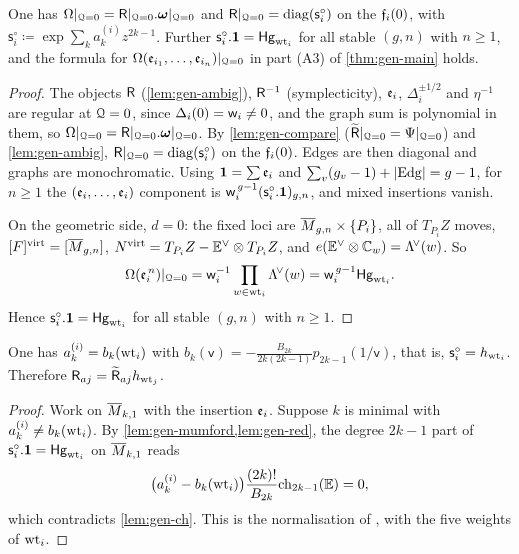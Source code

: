 \begin{lem}[Reduction at $\cQ=0$]
\label{lem:gen-red}
One has $\Omega|_{\mathcal{Q}=0}=\mathsf{R}|_{\mathcal{Q}=0}.\boldsymbol{\omega}|_{\mathcal{Q}=0}$ and $\mathsf{R}|_{\mathcal{Q}=0}=\mathrm{diag}(\mathsf{s}^{\circ}_i)$ on the $\mathfrak{f}_i(0)$, with $\mathsf{s}^{\circ}_i\coloneqq\exp\sum_ka_k^{(i)}z^{2k-1}$. Further $\mathsf{s}^{\circ}_i.\mathbf{1}=\mathsf{Hg}_{\mathrm{wt}_i}$ for all stable $(g,n)$ with $n\geq1$, and the formula for $\Omega(\mathfrak{e}_{i_1},\dots,\mathfrak{e}_{i_n})|_{\mathcal{Q}=0}$ in part (A3) of \cref{thm:gen-main} holds.
\end{lem}
\begin{proof}
The objects $\mathsf{R}$ (\cref{lem:gen-ambig}), $\mathsf{R}^{-1}$ (symplecticity), $\mathfrak{e}_i$, $\Delta_i^{\pm1/2}$ and $\eta^{-1}$ are regular at $\cQ=0$, since $\Delta_i(0)=\mathsf{w}_i\neq0$, and the graph sum is polynomial in them, so $\Omega|_{\mathcal{Q}=0}=\mathsf{R}|_{\mathcal{Q}=0}.\boldsymbol{\omega}|_{\mathcal{Q}=0}$. By \cref{lem:gen-compare} ($\widetilde{\mathsf{R}}|_{\mathcal{Q}=0}=\Psi|_{\mathcal{Q}=0}$) and \cref{lem:gen-ambig}, $\mathsf{R}|_{\mathcal{Q}=0}=\mathrm{diag}(\mathsf{s}^{\circ}_i)$ on the $\mathfrak{f}_i(0)$. Edges are then diagonal and graphs are monochromatic. Using $\mathbf{1}=\sum\mathfrak{e}_i$ and $\sum_v(g_v-1)+|\mathrm{Edg}|=g-1$, for $n\geq1$ the $(\mathfrak{e}_i,\dots,\mathfrak{e}_i)$ component is $\mathsf{w}_i^{\,g-1}(\mathsf{s}^{\circ}_i.\mathbf{1})_{g,n}$, and mixed insertions vanish.

On the geometric side, $d=0$: the fixed loci are $\overline{M}_{g,n}\times\{P_i\}$, all of $T_{P_i}Z$ moves, $[F]^{\mathrm{virt}}=[\overline{M}_{g,n}]$, $N^{\mathrm{virt}}=T_{P_i}Z-\mathbb{E}^\vee\otimes T_{P_i}Z$, and $e(\mathbb{E}^\vee\otimes\mathbb{C}_w)=\Lambda^{\!\vee}(w)$. So
\[
\Omega(\mathfrak{e}_i^{\,n})|_{\mathcal{Q}=0}=\mathsf{w}_i^{-1}\prod_{w\in\mathrm{wt}_i}\Lambda^{\!\vee}(w)=\mathsf{w}_i^{\,g-1}\mathsf{Hg}_{\mathrm{wt}_i}.
\]
Hence $\mathsf{s}^{\circ}_i.\mathbf{1}=\mathsf{Hg}_{\mathrm{wt}_i}$ for all stable $(g,n)$ with $n\geq1$.
\end{proof}

\begin{thm}
\label{thm:gen-const}
One has $a_k^{(i)}=b_k(\mathrm{wt}_i)$ with $b_k(\mathsf{v})=-\frac{B_{2k}}{2k(2k-1)}p_{2k-1}(1/\mathsf{v})$, that is, $\mathsf{s}^{\circ}_i=h_{\mathrm{wt}_i}$. Therefore $\mathsf{R}_{aj}=\widetilde{\mathsf{R}}_{aj}h_{\mathrm{wt}_j}$.
\end{thm}
\begin{proof}
Work on $\overline{M}_{k,1}$ with the insertion $\mathfrak{e}_i$. Suppose $k$ is minimal with $a_k^{(i)}\neq b_k(\mathrm{wt}_i)$. By \cref{lem:gen-mumford,lem:gen-red}, the degree $2k-1$ part of $\mathsf{s}^{\circ}_i.\mathbf{1}=\mathsf{Hg}_{\mathrm{wt}_i}$ on $\overline{M}_{k,1}$ reads
\[
\big(a_k^{(i)}-b_k(\mathrm{wt}_i)\big)\frac{(2k)!}{B_{2k}}\mathrm{ch}_{2k-1}(\mathbb{E})=0,
\]
which contradicts \cref{lem:gen-ch}. This is the normalisation of \cite{BS}, with the five weights of $\mathrm{wt}_i$. 
\end{proof}


